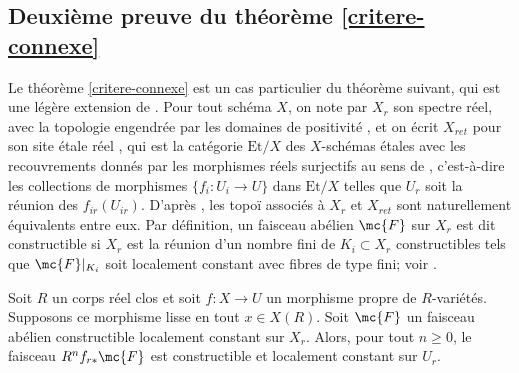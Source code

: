 \subsection{Deuxième preuve du théorème \ref{critere-connexe}}
Le théorème \ref{critere-connexe} est un cas particulier du
théorème suivant, qui est une légère extension de \cite[Cor.\,17.20(a)]{scheiderer1994real}. Pour tout schéma $X$, on note par $X_r$ son spectre réel, avec la topologie engendrée par les domaines de positivité \cite[(0.4.1)--(0.4.2)]{scheiderer1994real}, et on écrit $X_{ret}$ pour son site étale réel \cite[Def.\,1.2.1]{scheiderer1994real}, qui est la catégorie $\mathrm{Et}/X$ des $X$-schémas étales avec les recouvrements donnés par les morphismes réels surjectifs au sens de \cite[Def.\,(1.1)]{scheiderer1994real}, c'est-à-dire les collections de morphismes $\{f_i\colon U_i\to U\}$ dans $\mathrm{Et}/X$ telles que $U_r$ soit la réunion des $f_{ir}(U_{ir})$. D'après \cite[Th.\,1.3]{scheiderer1994real}, les topoï associés à $X_r$ et $X_{ret}$ sont naturellement équivalents entre eux. Par définition, un faisceau abélien $\mc{F}$ sur $X_r$ est dit constructible si $X_r$ est la réunion d'un nombre fini de $K_i\subset X_r$ constructibles tels que $\mc{F}|_{K_i}$ soit localement constant avec fibres de type fini; voir \cite[Def.\,(A.3)]{scheiderer1994real}.

\begin{thm}\label{loc-const}
Soit $R$ un corps réel clos et soit $f\colon X\to U$ un morphisme propre de $R$-variétés. Supposons ce morphisme lisse en tout $x\in X(R)$. Soit $\mc{F}$ un faisceau abélien constructible localement constant sur $X_r$. Alors, pour tout $n\geq 0$, le faisceau $R^n f_{r*} \mc{F}$ est constructible et localement constant sur $U_r$.
\end{thm}

